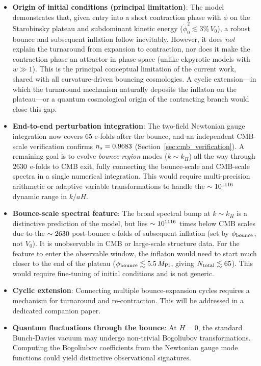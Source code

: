\documentclass[11pt,a4paper]{article}
\begin{document}
\begin{itemize}
\item \textbf{Origin of initial conditions (principal limitation)}: The model demonstrates that, given entry into a short contraction phase with $\phi$ on the Starobinsky plateau and subdominant kinetic energy ($\dot\phi_0^2 \lesssim 3\%\,V_0$), a robust bounce and subsequent inflation follow inevitably. However, it does \emph{not} explain the turnaround from expansion to contraction, nor does it make the contraction phase an attractor in phase space (unlike ekpyrotic models with $w \gg 1$). This is the principal conceptual limitation of the current work, shared with all curvature-driven bouncing cosmologies. A cyclic extension---in which the turnaround mechanism naturally deposits the inflaton on the plateau---or a quantum cosmological origin of the contracting branch would close this gap.
\item \textbf{End-to-end perturbation integration}: The two-field Newtonian gauge integration now covers 65 e-folds after the bounce, and an independent CMB-scale verification confirms $n_s = 0.9683$ (Section~\ref{sec:cmb_verification}). A remaining goal is to evolve \emph{bounce-region} modes ($k \sim k_H$) all the way through $2630$ e-folds to CMB exit, fully connecting the bounce-scale and CMB-scale spectra in a single numerical integration. This would require multi-precision arithmetic or adaptive variable transformations to handle the $\sim 10^{1116}$ dynamic range in $k/aH$.
\item \textbf{Bounce-scale spectral feature}: The broad spectral bump at $k \sim k_H$ is a distinctive prediction of the model, but lies $\sim 10^{1116}$ times below CMB scales due to the $\sim 2630$ post-bounce e-folds of subsequent inflation (set by $\phi_{\rm bounce}$, not $V_0$). It is unobservable in CMB or large-scale structure data. For the feature to enter the observable window, the inflaton would need to start much closer to the end of the plateau ($\phi_{\rm bounce} \lesssim 5.5\,M_{\rm Pl}$, giving $N_{\rm total} \lesssim 65$). This would require fine-tuning of initial conditions and is not generic.
\item \textbf{Cyclic extension}: Connecting multiple bounce-expansion cycles requires a mechanism for turnaround and re-contraction. This will be addressed in a dedicated companion paper.
\item \textbf{Quantum fluctuations through the bounce}: At $H=0$, the standard Bunch-Davies vacuum may undergo non-trivial Bogoliubov transformations. Computing the Bogoliubov coefficients from the Newtonian gauge mode functions could yield distinctive observational signatures.

\end{itemize}
\end{document}
